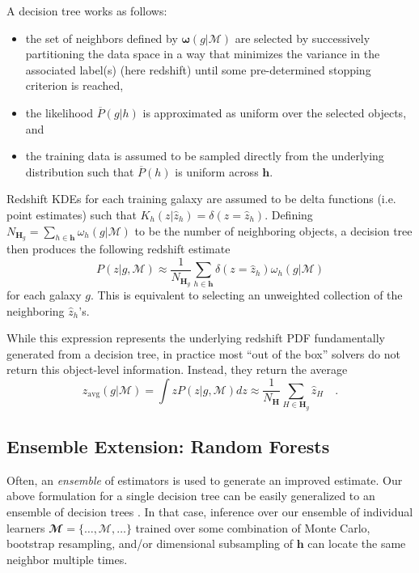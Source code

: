 \documentclass[a4paper,fleqn,usenatbib,english]{mnras}
\newcommand{\rom}[2]{\ensuremath{#1_{\mathrm{#2}}}} %
\begin{document}
A decision tree works as follows:
\begin{itemize}
	\item the set of neighbors defined by $\boldsymbol{\omega}(g|\mathcal{M})$ are selected by successively partitioning the data space in a way that minimizes the variance in the associated label(s) (here redshift) until some pre-determined stopping criterion is reached,
    \item the likelihood $\overline{P}(g|h)$ is approximated as uniform over the selected objects, and
    \item the training data is assumed to be sampled directly from the underlying distribution such that $\overline{P}(h)$ is uniform across $\mathbf{h}$.
\end{itemize}
Redshift KDEs for each training galaxy are assumed to be delta functions (i.e. point estimates) such that $K_h(z|\hat{z}_h)=\delta(z=\hat{z}_h)$. Defining $N_{\mathbf{H}_g} = \sum_{h\in\mathbf{h}} \omega_h(g|\mathcal{M})$ to be the number of neighboring objects, a decision tree then produces the following redshift estimate
\begin{equation}
P(z|g,\mathcal{M}) \approx \frac{1}{N_{\mathbf{H}_g}} \sum_{h \in \mathbf{h}} \delta(z=\hat{z}_h) \omega_h(g|\mathcal{M})
\end{equation}
for each galaxy $g$. This is equivalent to selecting an unweighted collection of the neighboring $\hat{z}_h$'s.

While this expression represents the underlying redshift PDF fundamentally generated from a decision tree, in practice most ``out of the box'' solvers \citep[such as from, e.g., \texttt{scikit-learn};][]{pedregosa+11} do not return this object-level information. Instead, they return the average
\begin{equation}
\rom{z}{avg}(g|\mathcal{M})=\int z P(z|g,\mathcal{M}) dz \approx \frac{1}{N_{\mathbf{H}}} \sum_{H \in \mathbf{H}_g} \hat{z}_H \quad .
\end{equation}

\subsection{Ensemble Extension: Random Forests}
\label{subsec:rf_bayes_approx}

Often, an \textit{ensemble} of estimators is used to generate an improved estimate. Our above formulation for a single decision tree can be easily generalized to an ensemble of decision trees \citep[i.e. a \textit{random forest};][]{breiman96,breiman01}. In that case, inference over our ensemble of individual learners $\mathbfcal{M}=\lbrace \ldots,\mathcal{M},\ldots \rbrace$ trained over some combination of Monte Carlo, bootstrap resampling, and/or dimensional subsampling of $\mathbf{h}$ can locate the same neighbor multiple times. 
\end{document}

